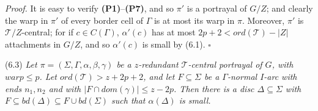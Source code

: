 \textit{Proof.} It is easy to verify \textbf{(P1)}--\textbf{(P7)}, and so $\pi'$ is a portrayal of $G/Z$; and clearly the warp in $\pi'$ of every border cell of $\Gamma$ is at most its warp in $\pi$. Moreover, $\pi'$ is $\mathscr{T}/Z$-central; for if $c \in C(\Gamma)$, $\alpha'(c)$ has at most $2p + 2 < ord(\mathscr{T}) - |Z|$ attachments in $G/Z$, and so $\alpha'(c)$ is small by (6.1). $\square$

\stmt
(6.3) \textit{Let $\pi = (\Sigma, \Gamma, \alpha, \beta, \gamma)$ be a $z$-redundant $\mathscr{T}$-central portrayal of $G$, with $warp \le p$. Let $ord(\mathscr{T}) > z + 2p + 2$, and let $F \subseteq \Sigma$ be a $\Gamma$-normal $I$-arc with ends $n_1, n_2$ and with $|F \cap dom(\gamma)| \le z - 2p$. Then there is a disc $\Delta \subseteq \Sigma$ with $F \subseteq bd(\Delta) \subseteq F \cup bd(\Sigma)$ such that $\alpha(\Delta)$ is small.}
